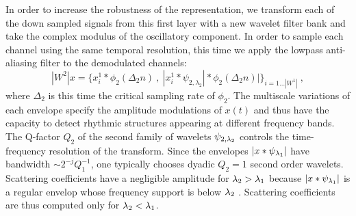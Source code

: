 In order to increase the robustness of the representation, we transform each of the down sampled signals from this first layer
with a new wavelet filter bank and take the complex modulus of the oscillatory component. 
In order to sample each channel using the same temporal resolution, this time we apply the lowpass anti-aliasing filter to the demodulated channels:
\begin{equation}
\label{scatnonjoint}
|W^2| x = \{ x^1_i \ast \phi_{2}  (\Delta_2 n)~,~| x^1_i \ast \psi_{2,\lambda_2} | \ast \phi_{2}(\Delta_2 n)| \}_{i=1\dots |W^1|}~,
\end{equation}
where $\Delta_2$ is this time the critical sampling rate of $\phi_2$. 
The multiscale variations of each envelope specify the amplitude modulations of $x(t)$ \cite{deepscatt} and  thus have the capacity to detect rhythmic structures appearing at different 
frequency bands. 
The Q-factor $Q_2$ of the second family of wavelets $\psi_{2,{\lambda}_2}$ 
controls the time-frequency resolution of the transform. 
Since the envelopes $| x \ast \psi_{{\lambda}_1}|$ have bandwidth $\sim 2^{-j} Q_1^{-1}$, 
one typically chooses dyadic $Q_2=1$ second order wavelets.
Scattering coefficients have a negligible amplitude for
${\lambda}_2 > {\lambda}_1$ because $|x \ast \psi_{{\lambda}_1}|$ is a regular envelop
whose frequency support is below ${\lambda}_2$ \cite{pami}. 
Scattering coefficients are thus computed only for ${\lambda}_2 < {\lambda}_1$. 


